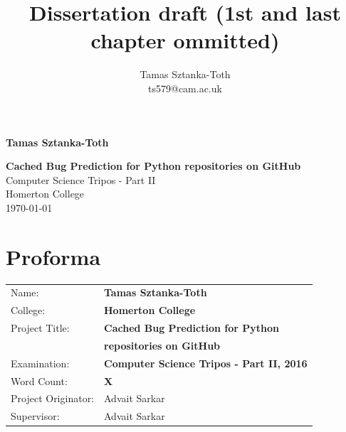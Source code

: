 \documentclass[12pt,twoside,notitlepage]{report}
\title{Dissertation draft (1st and last chapter ommitted)}
\author{Tamas Sztanka-Toth \\ ts579@cam.ac.uk}
\begin{document}
\setcounter{page}{1}
\pagestyle{plain}



\pagestyle{empty}

\hfill{\LARGE \bf Tamas Sztanka-Toth}

\vspace*{60mm}
\begin{center}
\Huge
{\bf Cached Bug Prediction for Python repositories on GitHub} \\
\vspace*{5mm}
Computer Science Tripos - Part II \\
\vspace*{5mm}
Homerton College \\
\vspace*{5mm}
\today  %
\end{center}

\cleardoublepage


\setcounter{page}{1}
\pagestyle{plain}

\chapter*{Proforma}

{\large
\begin{tabular}{ll}
Name:               & \bf Tamas Sztanka-Toth                       \\
College:            & \bf Homerton College                     \\
Project Title:      & \bf Cached Bug Prediction for Python\\ 						& \bf repositories on GitHub \\
Examination:        & \bf Computer Science Tripos - Part II, 2016        \\
Word Count:         & \bf X\footnotemark[1]				 \\
Project Originator: & Advait Sarkar                \\
Supervisor:         & Advait Sarkar                    \\ 
\end{tabular}
}
\end{document}
